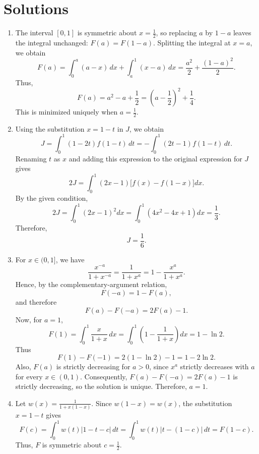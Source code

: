 \documentclass[11pt,a4paper]{article}
\begin{document}
\section*{Solutions}
\begin{enumerate}
\item The interval $[0,1]$ is symmetric about $x=\frac12$, so replacing $a$ by $1-a$ leaves the integral unchanged: $F(a)=F(1-a)$. Splitting the integral at $x=a$, we obtain
\[
F(a)=\int_0^a(a-x)\,dx+\int_a^1(x-a)\,dx
=\frac{a^2}{2}+\frac{(1-a)^2}{2}.
\]
Thus,
\[
F(a)=a^2-a+\frac12=\left(a-\frac12\right)^2+\frac14.
\]
This is minimized uniquely when $a=\frac12$.
\item Using the substitution $x=1-t$ in $J$, we obtain
\[
J=\int_0^1(1-2t)f(1-t)\,dt=-\int_0^1(2t-1)f(1-t)\,dt.
\]
Renaming $t$ as $x$ and adding this expression to the original expression for $J$ gives
\[
2J=\int_0^1(2x-1)\bigl[f(x)-f(1-x)\bigr]dx.
\]
By the given condition,
\[
2J=\int_0^1(2x-1)^2dx
=\int_0^1(4x^2-4x+1)dx
=\frac{1}{3}.
\]
Therefore,
\[
J=\frac{1}{6}.
\]
\item For $x\in(0,1]$, we have
\[
\frac{x^{-a}}{1+x^{-a}}=\frac{1}{1+x^a}=1-\frac{x^a}{1+x^a}.
\]
Hence, by the complementary-argument relation,
\[
F(-a)=1-F(a),
\]
and therefore
\[
F(a)-F(-a)=2F(a)-1.
\]
Now, for $a=1$,
\[
F(1)=\int_0^1\frac{x}{1+x}\,dx
=\int_0^1\left(1-\frac1{1+x}\right)dx
=1-\ln2.
\]
Thus
\[
F(1)-F(-1)=2(1-\ln2)-1=1-2\ln2.
\]
Also, $F(a)$ is strictly decreasing for $a>0$, since $x^a$ strictly decreases with $a$ for every $x\in(0,1)$. Consequently, $F(a)-F(-a)=2F(a)-1$ is strictly decreasing, so the solution is unique. Therefore, $\boxed{a=1}$.

\item Let $w(x)=\frac{1}{1+x(1-x)}$. Since $w(1-x)=w(x)$, the substitution $x=1-t$ gives
\[
F(c)=\int_0^1 w(t)|1-t-c|\,dt=\int_0^1 w(t)|t-(1-c)|\,dt=F(1-c).
\]
Thus, $F$ is symmetric about $c=\frac12$.


\end{enumerate}
\end{document}

